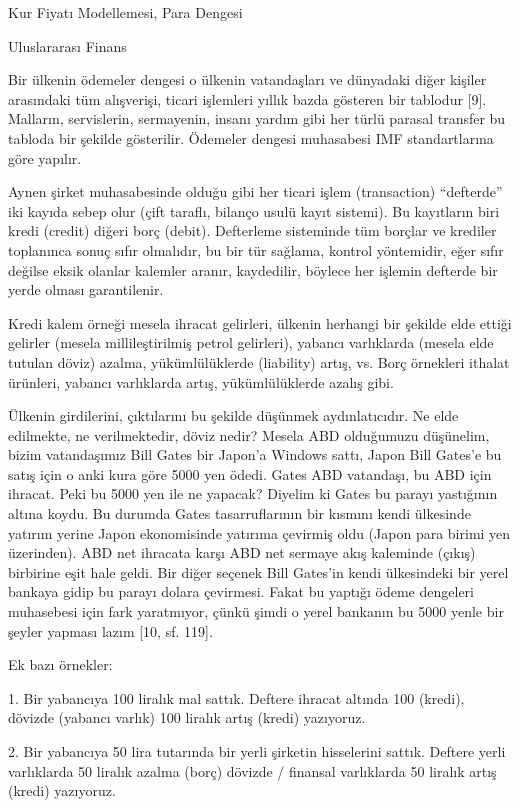 \documentclass[12pt,fleqn]{article}\usepackage{../../common}
\begin{document}
Kur Fiyatı Modellemesi, Para Dengesi

Uluslararası Finans

Bir ülkenin ödemeler dengesi o ülkenin vatandaşları ve dünyadaki diğer
kişiler arasındaki tüm alışverişi, ticari işlemleri yıllık bazda gösteren
bir tablodur [9]. Malların, servislerin, sermayenin, insanı yardım gibi her
türlü parasal transfer bu tabloda bir şekilde gösterilir. Ödemeler dengesi
muhasabesi IMF standartlarına göre yapılır.

Aynen şirket muhasabesinde olduğu gibi her ticari işlem (transaction)
``defterde'' iki kayıda sebep olur (çift taraflı, bilanço usulü kayıt
sistemi). Bu kayıtların biri kredi (credit) diğeri borç (debit). Defterleme
sisteminde tüm borçlar ve krediler toplanınca sonuç sıfır olmalıdır, bu bir tür
sağlama, kontrol yöntemidir, eğer sıfır değilse eksik olanlar kalemler aranır,
kaydedilir, böylece her işlemin defterde bir yerde olması garantilenir.

Kredi kalem örneği mesela ihracat gelirleri, ülkenin herhangi bir şekilde
elde ettiği gelirler (mesela millileştirilmiş petrol gelirleri), yabancı
varlıklarda (mesela elde tutulan döviz) azalma, yükümlülüklerde (liability)
artış, vs. Borç örnekleri ithalat ürünleri, yabancı varlıklarda artış,
yükümlülüklerde azalış gibi.

Ülkenin girdilerini, çıktılarını bu şekilde düşünmek aydınlatıcıdır. Ne
elde edilmekte, ne verilmektedir, döviz nedir? Mesela ABD olduğumuzu
düşünelim, bizim vatandaşımız Bill Gates bir Japon'a Windows sattı, Japon
Bill Gates'e bu satış için o anki kura göre 5000 yen ödedi. Gates ABD
vatandaşı, bu ABD için ihracat. Peki bu 5000 yen ile ne yapacak?  Diyelim
ki Gates bu parayı yastığının altına koydu. Bu durumda Gates
tasarruflarının bir kısmını kendi ülkesinde yatırım yerine Japon
ekonomisinde yatırıma çevirmiş oldu (Japon para birimi yen üzerinden). ABD
net ihracata karşı ABD net sermaye akış kaleminde (çıkış) birbirine eşit
hale geldi. Bir diğer seçenek Bill Gates'in kendi ülkesindeki bir yerel
bankaya gidip bu parayı dolara çevirmesi. Fakat bu yaptığı ödeme dengeleri
muhasebesi için fark yaratmıyor, çünkü şimdi o yerel bankanın bu 5000 yenle
bir şeyler yapması lazım [10, sf. 119].

Ek bazı örnekler:

1. Bir yabancıya 100 liralık mal sattık. Deftere ihracat altında 100
(kredi), dövizde (yabancı varlık) 100 liralık artış (kredi) yazıyoruz.

2. Bir yabancıya 50 lira tutarında bir yerli şirketin hisselerini sattık.
Deftere yerli varlıklarda 50 liralık azalma (borç) dövizde / finansal
varlıklarda 50 liralık artış (kredi) yazıyoruz.
\end{document}
